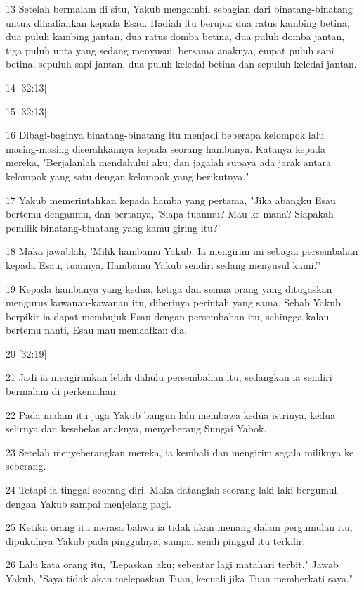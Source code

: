 \par 13 Setelah bermalam di situ, Yakub mengambil sebagian dari binatang-binatang untuk dihadiahkan kepada Esau. Hadiah itu berupa: dua ratus kambing betina, dua puluh kambing jantan, dua ratus domba betina, dua puluh domba jantan, tiga puluh unta yang sedang menyusui, bersama anaknya, empat puluh sapi betina, sepuluh sapi jantan, dua puluh keledai betina dan sepuluh keledai jantan.
\par 14 [32:13]
\par 15 [32:13]
\par 16 Dibagi-baginya binatang-binatang itu menjadi beberapa kelompok lalu masing-masing diserahkannya kepada seorang hambanya. Katanya kepada mereka, "Berjalanlah mendahului aku, dan jagalah supaya ada jarak antara kelompok yang satu dengan kelompok yang berikutnya."
\par 17 Yakub memerintahkan kepada hamba yang pertama, "Jika abangku Esau bertemu denganmu, dan bertanya, 'Siapa tuanmu? Mau ke mana? Siapakah pemilik binatang-binatang yang kamu giring itu?'
\par 18 Maka jawablah, 'Milik hambamu Yakub. Ia mengirim ini sebagai persembahan kepada Esau, tuannya. Hambamu Yakub sendiri sedang menyusul kami.'"
\par 19 Kepada hambanya yang kedua, ketiga dan semua orang yang ditugaskan mengurus kawanan-kawanan itu, diberinya perintah yang sama. Sebab Yakub berpikir ia dapat membujuk Esau dengan persembahan itu, sehingga kalau bertemu nanti, Esau mau memaafkan dia.
\par 20 [32:19]
\par 21 Jadi ia mengirimkan lebih dahulu persembahan itu, sedangkan ia sendiri bermalam di perkemahan.
\par 22 Pada malam itu juga Yakub bangun lalu membawa kedua istrinya, kedua selirnya dan kesebelas anaknya, menyeberang Sungai Yabok.
\par 23 Setelah menyeberangkan mereka, ia kembali dan mengirim segala miliknya ke seberang.
\par 24 Tetapi ia tinggal seorang diri. Maka datanglah seorang laki-laki bergumul dengan Yakub sampai menjelang pagi.
\par 25 Ketika orang itu merasa bahwa ia tidak akan menang dalam pergumulan itu, dipukulnya Yakub pada pinggulnya, sampai sendi pinggul itu terkilir.
\par 26 Lalu kata orang itu, "Lepaskan aku; sebentar lagi matahari terbit." Jawab Yakub, "Saya tidak akan melepaskan Tuan, kecuali jika Tuan memberkati saya."
